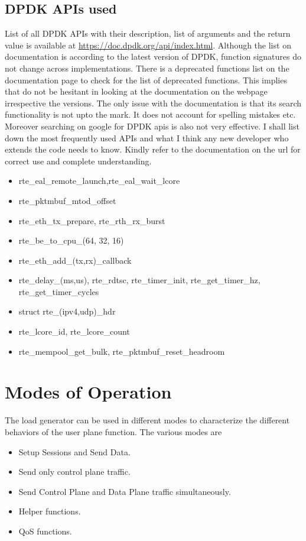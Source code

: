 \documentclass{article}
\begin{document}
\subsection{DPDK APIs used}
List of all DPDK APIs with their description, list of arguments and the return value is available at \url{https://doc.dpdk.org/api/index.html}. Although the list on documentation is according to the latest version of DPDK, function signatures do not change across implementations. There is a deprecated functions list on the documentation page to check for the list of deprecated functions. This implies that do not be hesitant in looking at the documentation on the webpage irrespective  the versions. The only issue with the documentation is that its search functionality is not upto the mark. It does not account for spelling mistakes etc. Moreover searching on google for DPDK apis is also not very effective.
I shall list down the most frequently used APIs and what I think any new developer who extends the code needs to know. Kindly refer to  the documentation on the url for correct use and complete understanding.
\begin{itemize}
    \item rte\_eal\_remote\_launch,rte\_eal\_wait\_lcore
    \item rte\_pktmbuf\_mtod\_offset
    \item rte\_eth\_tx\_prepare, rte\_rth\_rx\_burst
    \item rte\_be\_to\_cpu\_(64, 32, 16)
    \item rte\_eth\_add\_(tx,rx)\_callback
    \item rte\_delay\_(ms,us), rte\_rdtsc, rte\_timer\_init, rte\_get\_timer\_hz, rte\_get\_timer\_cycles
    \item struct rte\_(ipv4,udp)\_hdr
    \item rte\_lcore\_id, rte\_lcore\_count
    \item rte\_mempool\_get\_bulk, rte\_pktmbuf\_reset\_headroom
\end{itemize}
\section{Modes of Operation}
The load generator can be used in different modes to characterize the different behaviors of the user plane function. The various modes are
\begin{itemize}
    \item Setup Sessions and Send Data.
    \item Send only control plane traffic.
    \item Send Control Plane and Data Plane traffic simultaneously.
    \item Helper functions.
    \item QoS functions.
\end{itemize}
\end{document}
